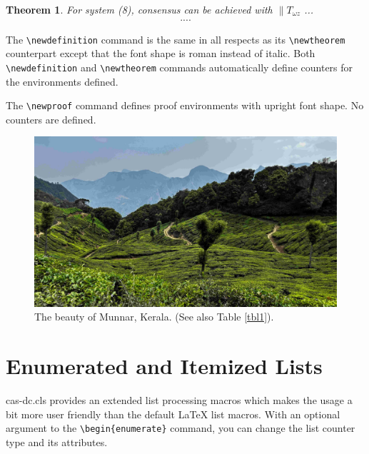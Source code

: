 \documentclass[a4paper,fleqn]{cas-dc}
\begin{document}
\newtheorem{theorem}{Theorem}

\begin{theorem}
For system (8), consensus can be achieved with 
$\|T_{\omega z}$ ...
\begin{eqnarray}\label{10}
....
\end{eqnarray}
\end{theorem}

The \verb+\newdefinition+ command is the same in
all respects as its \verb+\newtheorem+ counterpart except that
the font shape is roman instead of italic.  Both
\verb+\newdefinition+ and \verb+\newtheorem+ commands
automatically define counters for the environments defined.

The \verb+\newproof+ command defines proof environments with
upright font shape.  No counters are defined. 

\begin{figure}
	\centering
	\includegraphics[width=.9\textwidth]{figs/cas-munnar-2024.jpg}
	\caption{The beauty of Munnar, Kerala. (See also Table \protect\ref{tbl1}).}
	\label{FIG:2}
\end{figure}


\section[Enumerated ...]{Enumerated and Itemized Lists}
{cas-dc.cls} provides an extended list processing macros
which makes the usage a bit more user friendly than the default
\LaTeX{} list macros.   With an optional argument to the
\verb+\begin{enumerate}+ command, you can change the list counter
type and its attributes.
\end{document}
